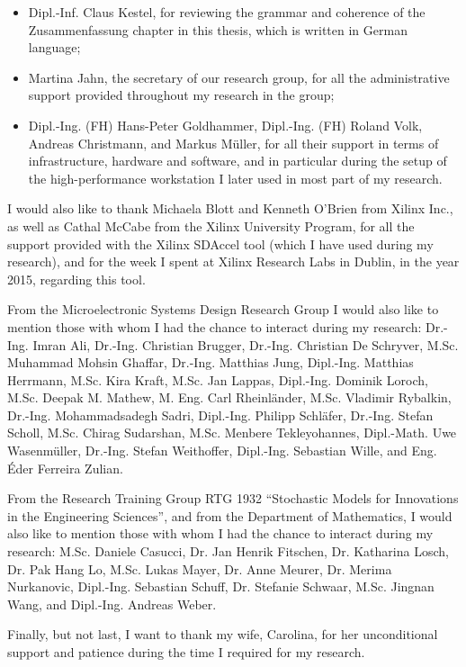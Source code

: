\begin{itemize}
	\vspace{-2mm}
	\item Dipl.-Inf. Claus Kestel, for reviewing the grammar and coherence of the Zusammenfassung chapter in this thesis, which is written in German language;

	\vspace{-2mm}
	\item Martina Jahn, the secretary of our research group, for all the administrative support provided throughout my research in the group;
	\vspace{-2mm}
	\item Dipl.-Ing. (FH) Hans-Peter Goldhammer, Dipl.-Ing. (FH) Roland Volk, Andreas Christmann, and Markus Müller, for all their support in terms of infrastructure, hardware and software, and in particular during the setup of the high-performance workstation I later used in most part of my research.
\end{itemize}

I would also like to thank Michaela Blott and Kenneth O'Brien from Xilinx Inc., as well as Cathal McCabe from the Xilinx University Program, for all the support provided with the Xilinx SDAccel tool (which I have used during my research), and for the week I spent at Xilinx Research Labs in Dublin, in the year 2015, regarding this tool.

From the Microelectronic Systems Design Research Group I would also like to mention those with whom I had the chance to interact during my research:
Dr.-Ing. Imran Ali, 
Dr.-Ing. Christian Brugger, 
Dr.-Ing. Christian De Schryver, 
M.Sc. Muhammad Mohsin Ghaffar, 
Dr.-Ing. Matthias Jung, 
Dipl.-Ing. Matthias Herrmann, 
M.Sc. Kira Kraft, 
M.Sc. Jan Lappas, 
Dipl.-Ing. Dominik Loroch, 
M.Sc. Deepak M. Mathew, 
M. Eng. Carl Rheinländer,
M.Sc. Vladimir Rybalkin, 
Dr.-Ing. Mohammadsadegh Sadri, 
Dipl.-Ing. Philipp Schläfer, 
Dr.-Ing. Stefan Scholl, 
M.Sc. Chirag Sudarshan,
M.Sc. Menbere Tekleyohannes, 
Dipl.-Math. Uwe Wasenmüller, 
Dr.-Ing. Stefan Weithoffer, 
Dipl.-Ing. Sebastian Wille,
and Eng. Éder Ferreira Zulian.

From the Research Training Group RTG 1932 ``Stochastic Models for Innovations in the Engineering Sciences'', and from the Department of Mathematics, I would also like to mention those with whom I had the chance to interact during my research:
M.Sc. Daniele Casucci, 
Dr. Jan Henrik Fitschen, 
Dr. Katharina Losch, 
Dr. Pak Hang Lo, 
M.Sc. Lukas Mayer, %
Dr. Anne Meurer, 
Dr. Merima Nurkanovic,
Dipl.-Ing. Sebastian Schuff, 
Dr. Stefanie Schwaar, 
M.Sc. Jingnan Wang, 
and Dipl.-Ing. Andreas Weber.


Finally, but not last, I want to thank my wife, Carolina, for her unconditional support and patience during the time I required for my research.
%



